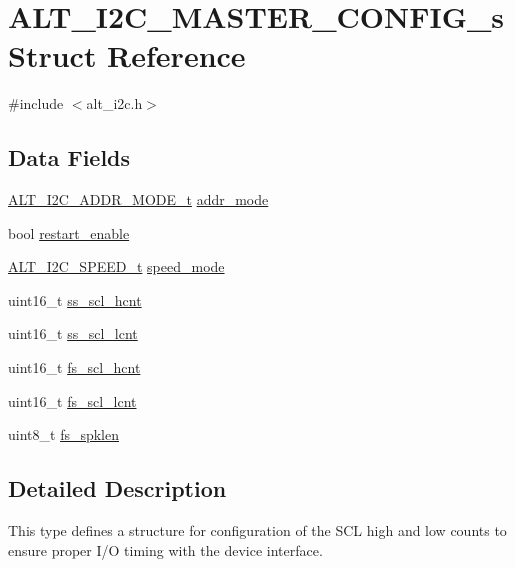 \hypertarget{structALT__I2C__MASTER__CONFIG__s}{}\section{A\+L\+T\+\_\+\+I2\+C\+\_\+\+M\+A\+S\+T\+E\+R\+\_\+\+C\+O\+N\+F\+I\+G\+\_\+s Struct Reference}
\label{structALT__I2C__MASTER__CONFIG__s}


{\ttfamily \#include $<$alt\+\_\+i2c.\+h$>$}

\subsection*{Data Fields}
\begin{DoxyCompactItemize}
\item 
\mbox{\hyperlink{group__ALT__I2C_gacaf56449440abffe69a7941f24f9bf5b}{A\+L\+T\+\_\+\+I2\+C\+\_\+\+A\+D\+D\+R\+\_\+\+M\+O\+D\+E\+\_\+t}} \mbox{\hyperlink{structALT__I2C__MASTER__CONFIG__s_a921c0ba4fc75b0cf621075eb419a20d1}{addr\+\_\+mode}}
\item 
bool \mbox{\hyperlink{structALT__I2C__MASTER__CONFIG__s_ae1dcf3ffffc1274129e15d18d2093a43}{restart\+\_\+enable}}
\item 
\mbox{\hyperlink{group__ALT__I2C_ga1601b0e27fb2a82170d10b4f6bdedbf6}{A\+L\+T\+\_\+\+I2\+C\+\_\+\+S\+P\+E\+E\+D\+\_\+t}} \mbox{\hyperlink{structALT__I2C__MASTER__CONFIG__s_a4f335cf08b9832cf923796860f09bd05}{speed\+\_\+mode}}
\item 
uint16\+\_\+t \mbox{\hyperlink{structALT__I2C__MASTER__CONFIG__s_a2c2147d744d76fa6df10232eecb097fa}{ss\+\_\+scl\+\_\+hcnt}}
\item 
uint16\+\_\+t \mbox{\hyperlink{structALT__I2C__MASTER__CONFIG__s_a42a8443ec6e4f7524c0cc6b5c58d676e}{ss\+\_\+scl\+\_\+lcnt}}
\item 
uint16\+\_\+t \mbox{\hyperlink{structALT__I2C__MASTER__CONFIG__s_a58f4621200f41b649d45bb5fbd9ae8ca}{fs\+\_\+scl\+\_\+hcnt}}
\item 
uint16\+\_\+t \mbox{\hyperlink{structALT__I2C__MASTER__CONFIG__s_ae9010068db86d57b4c0b1a6159753c57}{fs\+\_\+scl\+\_\+lcnt}}
\item 
uint8\+\_\+t \mbox{\hyperlink{structALT__I2C__MASTER__CONFIG__s_aa453abc962f00a779d23150799c9be9d}{fs\+\_\+spklen}}
\end{DoxyCompactItemize}


\subsection{Detailed Description}
This type defines a structure for configuration of the S\+CL high and low counts to ensure proper I/O timing with the device interface.


